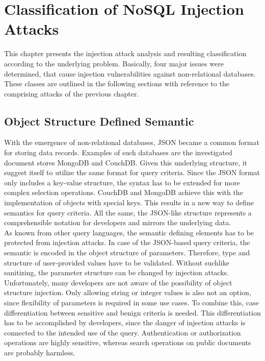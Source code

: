 \chapter{Classification of NoSQL Injection Attacks}
\label{cha:classification}
This chapter presents the injection attack analysis and resulting classification according to the underlying problem. Basically, four major issues were determined, that cause injection vulnerabilities against non-relational databases. These classes are outlined in the following sections with reference to the comprising attacks of the previous chapter.

\section{Object Structure Defined Semantic}
With the emergence of non-relational databases, JSON became a common format for storing data records. Examples of such databases are the investigated document stores MongoDB and CouchDB. Given this underlying structure, it suggest itself to utilize the same format for query criteria. Since the JSON format only includes a key-value structure, the syntax has to be extended for more complex selection operations. CouchDB and MongoDB achieve this with the implementation of objects with special keys. This results in a new way to define semantics for query criteria. All the same, the JSON-like structure represents a comprehensible notation for developers and mirrors the underlying data. \\ 

As known from other query languages, the semantic defining elements has to be protected from injection attacks. In case of the JSON-based query criteria, the semantic is encoded in the object structure of parameters. Therefore, type and structure of user-provided values have to be validated. Without suchlike sanitizing, the parameter structure can be changed by injection attacks. Unfortunately, many developers are not aware of the possibility of object structure injection. Only allowing string or integer values is also not an option, since flexibility of parameters is required in some use cases. To combine this, case differentiation between sensitive and benign criteria is needed. This differentiation has to be accomplished by developers, since the danger of injection attacks is connected to the intended use of the query. Authentication or authorization operations are highly sensitive, whereas search operations on public documents are probably harmless. \\

